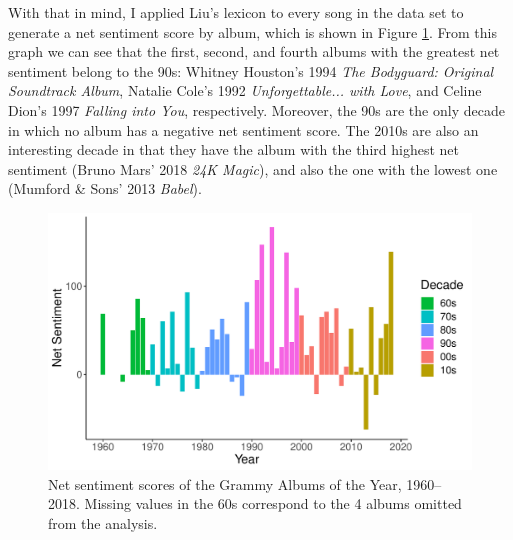 \documentclass{article}
\begin{document}
With that in mind, I applied Liu's lexicon to every song in the data set to generate a net sentiment score by album, which is shown in Figure \ref{fig:annual_sentiment}. From this graph we can see that the first, second, and fourth albums with the greatest net sentiment belong to the 90s: Whitney Houston's 1994 \textit{The Bodyguard: Original Soundtrack Album}, Natalie Cole's 1992 \textit{Unforgettable... with Love}, and Celine Dion's 1997 \textit{Falling into You}, respectively. Moreover, the 90s are the only decade in which no album has a negative net sentiment score. The 2010s are also an interesting decade in that they have the album with the third highest net sentiment (Bruno Mars' 2018 \textit{24K Magic}), and also the one with the lowest one (Mumford \& Sons' 2013 \textit{Babel}).


\begin{figure}[h]
    \centering
    \includegraphics[scale=0.5]{Plots/graph_annual_sentiment.pdf}
    \caption{Net sentiment scores of the Grammy Albums of the Year, 1960--2018. Missing values in the 60s correspond to the 4 albums omitted from the analysis.}
    \label{fig:annual_sentiment}
\end{figure}




\end{document}
